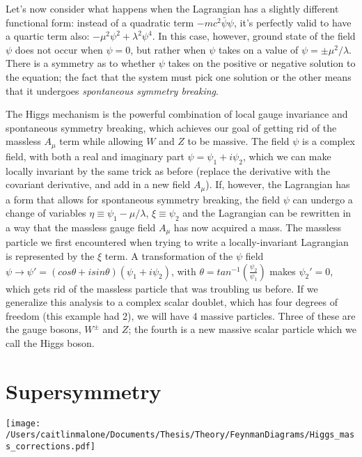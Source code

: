 Let's now consider what happens when the Lagrangian has a slightly different functional form: instead of a quadratic term $-mc^2\bar{\psi}\psi$, it's perfectly valid to have a quartic term also: $-\mu^2\psi^2+\lambda^2 \psi^4$.  In this case, however, ground state of the field $\psi$ does not occur when $\psi=0$, but rather when $\psi$ takes on a value of $\psi = \pm \mu^2/\lambda$.  There is a symmetry as to whether $\psi$ takes on the positive or negative solution to the equation; the fact that the system must pick one solution or the other means that it undergoes \textit{spontaneous symmetry breaking}.

The Higgs mechanism is the powerful combination of local gauge invariance and spontaneous symmetry breaking, which achieves our goal of getting rid of the massless $A_\mu$ term while allowing $W$ and $Z$ to be massive.  The field $\psi$ is a complex field, with both a real and imaginary part $\psi=\psi_1+i\psi_2$, which we can make locally invariant by the same trick as before (replace the derivative with the covariant derivative, and add in a new field $A_\mu$).  If, however, the Lagrangian has a form that allows for spontaneous symmetry breaking, the field $\psi$ can undergo a change of variables $\eta\equiv \psi_1 - \mu/\lambda$, $\xi\equiv \psi_2$ and the Lagrangian can be rewritten in a way that the massless gauge field $A_\mu$ has now acquired a mass.  The massless particle we first encountered when trying to write a locally-invariant Lagrangian is represented by the $\xi$ term.  A transformation of the $\psi$ field $\psi \rightarrow \psi' = (cos\theta + i sin\theta)(\psi_1+i\psi_2)$, with $\theta=tan^{-1}(\frac{\psi_2}{\psi_1})$ makes $\psi_2'=0$, which gets rid of the massless particle that was troubling us before.  If we generalize this analysis to a  complex scalar doublet, which has four degrees of freedom (this example had 2), we will have 4 massive particles.  Three of these are the gauge bosons, $W^\pm$ and $Z$; the fourth is a new massive scalar particle which we call the Higgs boson.



 
 
 
\section{Supersymmetry}

\begin{centering}
\texttt{[image: /Users/caitlinmalone/Documents/Thesis/Theory/FeynmanDiagrams/Higgs\_mass\_corrections.pdf]}\label{fig:higgs_mass_corrections}
\end{centering}

